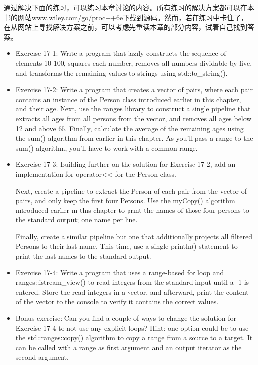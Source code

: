 通过解决下面的练习，可以练习本章讨论的内容。所有练习的解决方案都可以在本书的网站\url{www.wiley.com/go/proc++6e}下载到源码。然而，若在练习中卡住了，在从网站上寻找解决方案之前，可以考虑先重读本章的部分内容，试着自己找到答案。

\begin{itemize}
\item
Exercise 17-1: Write a program that lazily constructs the sequence of elements 10-100, squares each number, removes all numbers dividable by five, and transforms the remaining values to strings using std::to\_string().

\item
Exercise 17-2: Write a program that creates a vector of pairs, where each pair contains an instance of the Person class introduced earlier in this chapter, and their age. Next, use the ranges library to construct a single pipeline that extracts all ages from all persons from the vector, and removes all ages below 12 and above 65. Finally, calculate the average of the remaining ages using the sum() algorithm from earlier in this chapter. As you’ll pass a range to the sum() algorithm, you’ll have to work with a common range.

\item
Exercise 17-3: Building further on the solution for Exercise 17-2, add an implementation for operator<< for the Person class.

Next, create a pipeline to extract the Person of each pair from the vector of pairs, and only keep the first four Persons. Use the myCopy() algorithm introduced earlier in this chapter to print the names of those four persons to the standard output; one name per line.

Finally, create a similar pipeline but one that additionally projects all filtered Persons to their last name. This time, use a single println() statement to print the last names to the standard output.

\item
Exercise 17-4: Write a program that uses a range-based for loop and ranges::istream\_view() to read integers from the standard input until a -1 is entered. Store the read integers in a vector, and afterward, print the content of the vector to the console to verify it contains the correct values.

\item
Bonus exercise: Can you find a couple of ways to change the solution for Exercise 17-4 to not use any explicit loops? Hint: one option could be to use the std::ranges::copy() algorithm to copy a range from a source to a target. It can be called with a range as first argument and an output iterator as the second argument.
\end{itemize}




